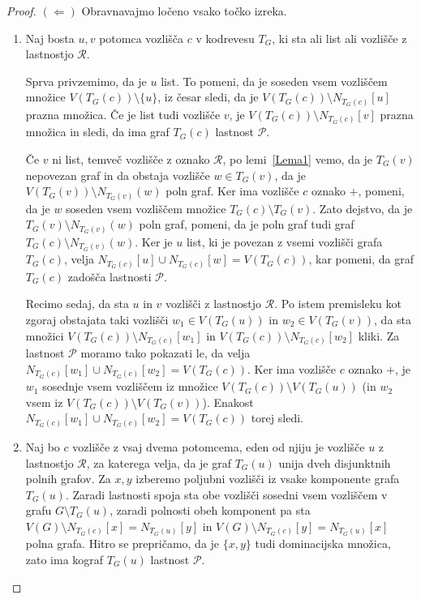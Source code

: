 \documentclass[12pt,a4paper,twoside]{article}
\theoremstyle{definition} %
\theoremstyle{plain} %
\numberwithin{equation}{section}  %
\begin{document}
\begin{proof}
\medskip
\noindent$(\Leftarrow)$ Obravnavajmo ločeno vsako točko izreka.
\begin{enumerate}[label=($\roman*$)]
\item Naj bosta $u,v$ potomca vozlišča $c$ v kodrevesu $T_G$, ki sta ali list ali vozlišče z lastnostjo $\mathcal{R}$.

Sprva privzemimo, da je $u$ list. To pomeni, da je soseden vsem vozliščem množice $V(T_G(c)) \setminus \{u\}$, iz česar sledi, da je $V(T_G(c)) \setminus N_{T_G(c)}[u]$ prazna množica. Če je list tudi vozlišče $v$, je $V(T_G(c)) \setminus N_{T_G(c)}[v]$ prazna množica in sledi, da ima graf $T_G(c)$ lastnost $\mathcal{P}$.

Če $v$ ni list, temveč vozlišče z oznako $\mathcal{R}$, po lemi~\ref{Lema1} vemo, da je $T_G(v)$ nepovezan graf in da obstaja vozlišče $w \in T_G(v)$, da je $V(T_G(v)) \setminus N_{T_G(v)}(w)$ poln graf. Ker ima vozlišče $c$ oznako $+$, pomeni, da je $w$ soseden vsem vozliščem množice $T_G(c) \setminus T_G(v)$. Zato dejstvo, da je $T_G(v) \setminus N_{T_G(v)}(w)$ poln graf, pomeni, da je poln graf tudi graf $T_G(c) \setminus N_{T_G(v)}(w)$. Ker je $u$ list, ki je povezan z vsemi vozlišči grafa $T_G(c)$, velja $N_{T_G(c)}[u] \cup N_{T_G(c)}[w] = V(T_G(c))$, kar pomeni, da graf $T_G(c)$ zadošča lastnosti $\mathcal{P}$.

Recimo sedaj, da sta $u$ in $v$ vozlišči z lastnostjo $\mathcal{R}$. Po istem premisleku kot zgoraj obstajata taki vozlišči $w_1 \in V(T_G(u))$ in $w_2 \in V(T_G(v))$, da sta množici $V(T_G(c)) \setminus N_{T_G(c)}[w_1]$ in $V(T_G(c)) \setminus N_{T_G(c)}[w_2]$ kliki. Za lastnost $\mathcal{P}$ moramo tako pokazati le, da velja $N_{T_G(c)}[w_1] \cup N_{T_G(c)}[w_2] = V(T_G(c))$. Ker ima vozlišče $c$ oznako $+$, je $w_1$ sosednje vsem vozliščem  iz množice $V(T_G(c)) \setminus V(T_G(u))$ (in $w_2$ vsem iz $V(T_G(c)) \setminus V(T_G(v))$). Enakost $N_{T_G(c)}[w_1] \cup N_{T_G(c)}[w_2] = V(T_G(c))$ torej sledi.

\item Naj bo $c$ vozlišče z vsaj dvema potomcema, eden od njiju je vozlišče $u$ z lastnostjo $\mathcal{R}$, za katerega velja, da je graf $T_G(u)$ unija dveh disjunktnih polnih grafov. Za $x,y$ izberemo poljubni vozlišči iz vsake komponente grafa $T_G(u)$. Zaradi lastnosti spoja sta obe vozlišči sosedni vsem vozliščem v grafu $G \setminus T_G(u)$, zaradi polnosti obeh komponent pa sta  $V(G) \setminus N_{T_G(c)}[x] = N_{T_G(u)}[y]$ in $V(G) \setminus N_{T_G(c)}[y] = N_{T_G(u)}[x]$ polna grafa. Hitro se prepričamo, da je $\{x, y\}$ tudi dominacijska množica, zato ima kograf $T_G(u)$ lastnost $\mathcal{P}$.\qedhere
\end{enumerate}
\end{proof}
\end{document}
